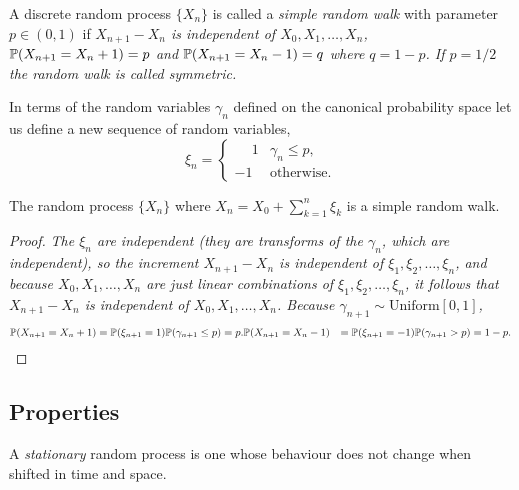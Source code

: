 \begin{definition}
A discrete random process $\{X_n\}$ is called a  \emph{simple random walk} with parameter $p\in(0,1)$ if
\ben
\it $X_{n+1}-X_n$ is independent of $X_0,X_1,\ldots,X_n$, 
\it $\mathbb{P}(X_{n+1} = X_n + 1) = p$ and $\mathbb{P}(X_{n+1} = X_n - 1) = q$ where $q=1-p$.
\een
If $p=1/2$ the random walk is called \emph{symmetric}.
\end{definition}


In terms of the random variables $\gamma_n$ defined on the canonical probability space let us define a new sequence of random variables,
\[
\xi_n = \begin{cases}
	\phantom{-}1	& \gamma_n\leq p, \\
	-1	& \text{otherwise.}
\end{cases}
\]
\begin{lemma}
The random process $\{X_n\}$ where $X_n = X_0 + \sum_{k=1}^n \xi_k$ is a simple random walk.
\begin{proof}
\ben
\it The $\xi_n$ are independent (they are transforms of the $\gamma_n$, which are independent), so the increment $X_{n+1}-X_n$ is independent of $\xi_1,\xi_2,\ldots,\xi_n$, and because $X_0,X_1,\ldots,X_n$ are just linear combinations of $\xi_1,\xi_2,\ldots,\xi_n$, it follows that $X_{n+1}-X_n$ is independent of $X_0,X_1,\ldots,X_n$.
\it Because $\gamma_{n+1}\sim\text{Uniform}[0,1]$,
\begin{align*}
\mathbb{P}(X_{n+1} = X_n + 1) 
	& = \mathbb{P}(\xi_{n+1} = 1) \mathbb{P}(\gamma_{n+1}\leq p) = p.
\mathbb{P}(X_{n+1} = X_n - 1) 
	& = \mathbb{P}(\xi_{n+1} = -1) \mathbb{P}(\gamma_{n+1} > p) = 1-p.
\end{align*}
\een
\end{proof}
\end{lemma}

\subsection{Properties}

\begin{definition}
A \emph{stationary} random process is one whose behaviour does not change when shifted in time and space.
\end{definition}

